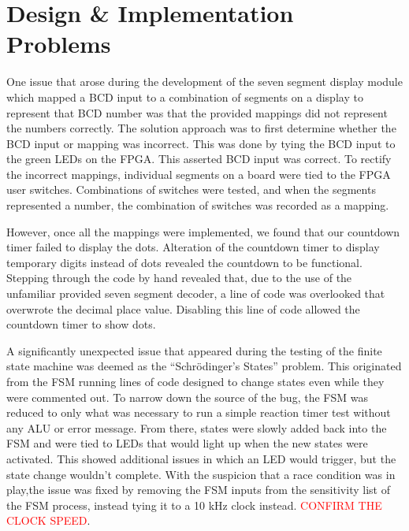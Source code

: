 \documentclass[11pt]{article}
\begin{document}
\section{Design \& Implementation Problems}

One issue that arose during the development of the seven segment display module which mapped a BCD input to a combination of segments on a display to represent that BCD number was that the provided mappings did not represent the numbers correctly. The solution approach was to first determine whether the BCD input or mapping was incorrect. This was done by tying the BCD input to the green LEDs on the FPGA. This asserted BCD input was correct. To rectify the incorrect mappings, individual segments on a board were tied to the FPGA user switches. Combinations of switches were tested, and when the segments represented a number, the combination of switches was recorded as a mapping.

However, once all the mappings were implemented, we found that our countdown timer failed to display the dots. Alteration of the countdown timer to display temporary digits instead of dots revealed the countdown to be functional. Stepping through the code by hand revealed that, due to the use of the unfamiliar provided seven segment decoder, a line of code was overlooked that overwrote the decimal place value. Disabling this line of code allowed the countdown timer to show dots.

A significantly unexpected issue that appeared during the testing of the finite state machine was deemed as the ``Schrödinger's States'' problem. This originated from the FSM running lines of code designed to change states even while they were commented out. To narrow down the source of the bug, the FSM was reduced to only what was necessary to run a simple reaction timer test without any ALU or error message. From there, states were slowly added back into the FSM and were tied to LEDs that would light up when the new states were activated. This showed additional issues in which an LED would trigger, but the state change wouldn't complete. With the suspicion that a race condition was in play,the issue was fixed by removing the FSM inputs from the sensitivity list of the FSM process, instead tying it to a 10 kHz clock instead. \textcolor{red}{CONFIRM THE CLOCK SPEED}.
\end{document}
